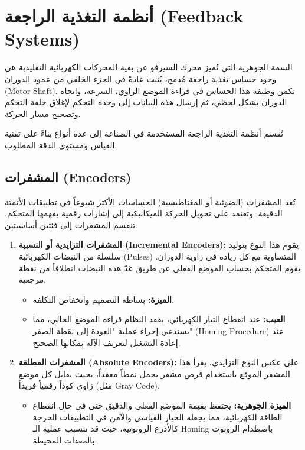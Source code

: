 \section{أنظمة التغذية الراجعة (\textenglish{Feedback Systems})}
\label{sec:feedback_systems}

السمة الجوهرية التي تُميز محرك السيرفو عن بقية المحركات الكهربائية التقليدية هي وجود حساس تغذية راجعة مُدمج، يُثبت عادةً في الجزء الخلفي من عمود الدوران (\textenglish{Motor Shaft}). تكمن وظيفة هذا الحساس في قراءة الموضع الزاوي، السرعة، واتجاه الدوران بشكل لحظي، ثم إرسال هذه البيانات إلى وحدة التحكم لإغلاق حلقة التحكم وتصحيح مسار الحركة.

تُقسم أنظمة التغذية الراجعة المستخدمة في الصناعة إلى عدة أنواع بناءً على تقنية القياس ومستوى الدقة المطلوب:

\subsection{المشفرات (\textenglish{Encoders})}
تُعد المشفرات (الضوئية أو المغناطيسية) الحساسات الأكثر شيوعاً في تطبيقات الأتمتة الدقيقة. وتعتمد على تحويل الحركة الميكانيكية إلى إشارات رقمية يفهمها المتحكم. تنقسم المشفرات إلى فئتين أساسيتين:

\begin{enumerate}
    \item \textbf{المشفرات التزايدية أو النسبية (\textenglish{Incremental Encoders}):}
    يقوم هذا النوع بتوليد سلسلة من النبضات الكهربائية (\textenglish{Pulses}) المتساوية مع كل زيادة في زاوية الدوران. يقوم المتحكم بحساب الموضع الفعلي عن طريق عَدّ هذه النبضات انطلاقاً من نقطة مرجعية. 
    \begin{itemize}
        \item \textbf{الميزة:} بساطة التصميم وانخفاض التكلفة.
        \item \textbf{العيب:} عند انقطاع التيار الكهربائي، يفقد النظام قراءة الموضع الحالي، مما يستدعي إجراء عملية "العودة إلى نقطة الصفر" (\textenglish{Homing Procedure}) عند إعادة التشغيل لتعريف الآلة بمكانها الصحيح.
    \end{itemize}
    
    \item \textbf{المشفرات المطلقة (\textenglish{Absolute Encoders}):}
    على عكس النوع التزايدي، يقرأ هذا المشفر الموقع باستخدام قرص مشفر يحمل نمطاً معقداً، بحيث يقابل كل موضع زاوي كوداً رقمياً فريداً (مثل \textenglish{Gray Code}).
    \begin{itemize}
        \item \textbf{الميزة الجوهرية:} يحتفظ بقيمة الموضع الفعلي والدقيق حتى في حال انقطاع الطاقة الكهربائية، مما يجعله الخيار القياسي والآمن في التطبيقات الحرجة كالأذرع الروبوتية، حيث قد تتسبب عملية الـ \textenglish{Homing} باصطدام الروبوت بالمعدات المحيطة.
    \end{itemize}
\end{enumerate}

